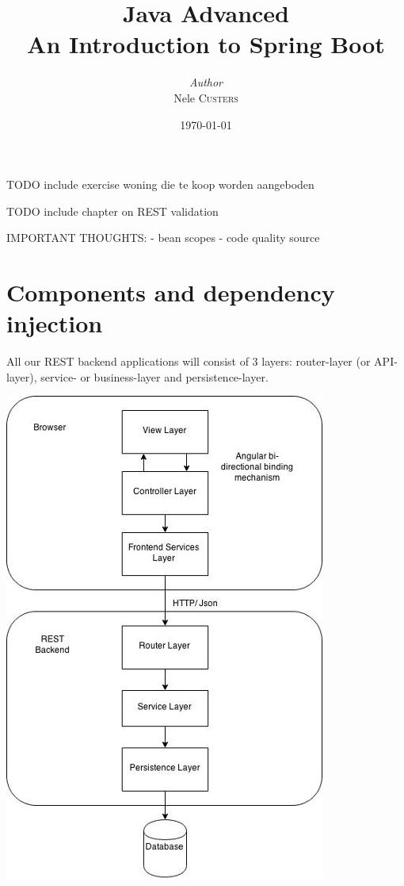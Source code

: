 \documentclass[a4paper, 12pt]{report}
\institute{Hogeschool PXL}
\title{Java Advanced\\An Introduction to Spring Boot}
\author{\textit{Author}\\Nele \textsc{Custers}}
\date{\today}
\begin{document}
    \maketitle
    \romantableofcontents
    
 
  




TODO include exercise woning die te koop worden aangeboden

TODO include chapter on REST validation








IMPORTANT THOUGHTS:
- bean scopes
- code quality
source



\section{Components and dependency injection}

All our REST backend applications will consist of 3 layers:
 router-layer (or API-layer), service- or business-layer and persistence-layer.

\includegraphics[scale=0.6]{./images/chapter1/spring-architecture.jpeg} 
\end{document}
